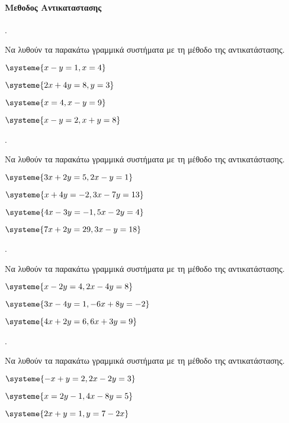 \documentclass[11pt,a4paper,twocolumn]{article}
\newcounter{askhsh}
\newcommand{\askhsh}{\large\theaskhsh.\ \addtocounter{askhsh}{1}}
\begin{document}
\paragraph{Μεθοδος Αντικαταστασης}
\askhsh Να λυθούν τα παρακάτω γραμμικά συστήματα με τη μέθοδο της αντικατάστασης.
\begin{multicols}{2}
\begin{alist}
\item $ \systeme{x-y=1,x=4} $
\item $ \systeme{2x+4y=8,y=3} $
\item $ \systeme{x=4,x-y=9} $
\item $ \systeme{x-y=2,x+y=8} $
\end{alist}
\end{multicols}
\askhsh Να λυθούν τα παρακάτω γραμμικά συστήματα με τη μέθοδο της αντικατάστασης.
\begin{multicols}{2}
\begin{alist}
\item $ \systeme{3x+2y=5,2x-y=1} $
\item $ \systeme{x+4y=-2,3x-7y=13} $
\item $ \systeme{4x-3y=-1,5x-2y=4} $
\item $ \systeme{7x+2y=29,3x-y=18} $
\end{alist}
\end{multicols}
\askhsh Να λυθούν τα παρακάτω γραμμικά συστήματα με τη μέθοδο της αντικατάστασης.
\begin{multicols}{2}
\begin{alist}
\item $ \systeme{x-2y=4,2x-4y=8} $
\item $ \systeme{3x-4y=1,-6x+8y=-2} $
\item $ \systeme{4x+2y=6,6x+3y=9} $
\end{alist}
\end{multicols}
\askhsh Να λυθούν τα παρακάτω γραμμικά συστήματα με τη μέθοδο της αντικατάστασης.
\begin{multicols}{2}
\begin{alist}
\item $ \systeme{-x+y=2,2x-2y=3} $
\item $ \systeme{x=2y-1,4x-8y=5} $
\item $ \systeme{2x+y=1,y=7-2x} $
\end{alist}
\end{multicols}
\end{document}
